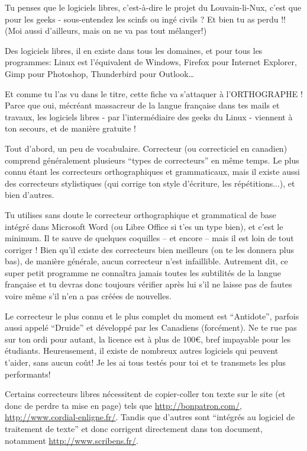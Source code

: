 \documentclass[12pt]{../fiche}
\begin{document}


Tu penses que le logiciels libres, c'est-à-dire le projet du Louvain-li-Nux, c'est que pour les geeks - sous-entendez les scinfs ou ingé civils ? Et bien tu as perdu !! (Moi aussi d'ailleurs, mais on ne va pas tout mélanger!)

Des logiciels libres, il en existe dans tous les domaines, et pour tous les programmes: Linux est l'équivalent de Windows, Firefox pour Internet Explorer, Gimp pour Photoshop, Thunderbird pour Outlook…

Et comme tu l'as vu dans le titre, cette fiche va s'attaquer à l'ORTHOGRAPHE ! Parce que oui, mécréant massacreur de la langue française dans tes mails et travaux, les logiciels libres - par l'intermédiaire des geeks du Linux - viennent à ton secours, et de manière gratuite !

Tout d'abord, un peu de vocabulaire. Correcteur (ou correcticiel en canadien) comprend généralement plusieurs ``types de correcteurs'' en même temps. Le plus connu étant les correcteurs orthographiques et grammaticaux, mais il existe aussi des correcteurs stylistiques (qui corrige ton style d'écriture, les répétitions...), et bien d'autres.

Tu utilises sans doute le correcteur orthographique et grammatical de base intégré dans Microsoft Word (ou Libre Office si t'es un type bien), et c'est le minimum. Il te sauve de quelques coquilles – et encore – mais il est loin de tout corriger ! Bien qu'il existe des correcteurs bien meilleurs (on te les donnera plus bas), de manière générale, aucun correcteur n'est infaillible. Autrement dit, ce super petit programme ne connaîtra jamais toutes les subtilités de la langue française et tu devras donc toujours vérifier après lui s'il ne laisse pas de fautes voire même s'il n'en a pas créées de nouvelles.

Le correcteur le plus connu et le plus complet du moment est ``Antidote'', parfois aussi appelé ``Druide'' et développé par les Canadiens (forcément). Ne te rue pas sur ton ordi pour autant, la licence est à plus de \si{100}{\euro}, bref impayable pour les étudiants. Heureusement, il existe de nombreux autres logiciels qui peuvent t'aider, sans aucun coût! Je les ai tous testés pour toi et te transmets les plus performants!

Certains correcteurs libres nécessitent de copier-coller ton texte sur le site (et donc de perdre ta mise en page) tels que \url{http://bonpatron.com/}, \url{http://www.cordial-enligne.fr/}.
Tandis que d'autres sont ``intégrés au logiciel de traitement de texte'' et donc corrigent directement dans ton document, notamment \url{http://www.scribens.fr/}.
\end{document}
